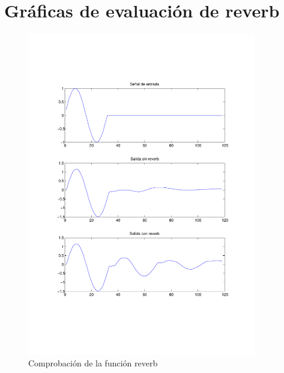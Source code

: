 \documentclass[a4paper,12pt]{article}
\begin{document}
\section{Gráficas de evaluación de reverb}\label{sec:resultadosreverb}
\begin{figure}[hbt]
\begin{center}
\includegraphics[width=10cm]{img/test_reverb.pdf} 
\caption{Comprobación de la función reverb} \label{fig:reverbgraph}
\end{center}
\end{figure}

\clearpage
\end{document}
